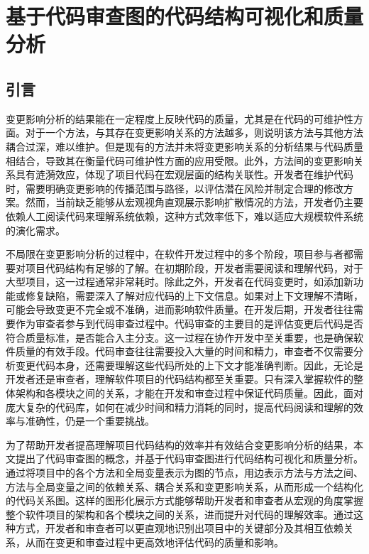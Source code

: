 \chapter{基于代码审查图的代码结构可视化和质量分析}
\section{引言}

变更影响分析的结果能在一定程度上反映代码的质量，尤其是在代码的可维护性方面。对于一个方法，与其存在变更影响关系的方法越多，则说明该方法与其他方法耦合过深，难以维护。但是现有的方法并未将变更影响关系的分析结果与代码质量相结合，导致其在衡量代码可维护性方面的应用受限。此外，方法间的变更影响关系具有涟漪效应，体现了项目代码在宏观层面的结构关联性。开发者在维护代码时，需要明确变更影响的传播范围与路径，以评估潜在风险并制定合理的修改方案。然而，当前缺乏能够从宏观视角直观展示影响扩散情况的方法，开发者仍主要依赖人工阅读代码来理解系统依赖，这种方式效率低下，难以适应大规模软件系统的演化需求。

不局限在变更影响分析的过程中，在软件开发过程中的多个阶段，项目参与者都需要对项目代码结构有足够的了解。在初期阶段，开发者需要阅读和理解代码，对于大型项目，这一过程通常非常耗时。除此之外，开发者在代码变更时，如添加新功能或修复缺陷，需要深入了解对应代码的上下文信息。如果对上下文理解不清晰，可能会导致变更不完全或不准确，进而影响软件质量。在开发后期，开发者往往需要作为审查者参与到代码审查过程中。代码审查的主要目的是评估变更后代码是否符合质量标准，是否能合入主分支。这一过程在协作开发中至关重要，也是确保软件质量的有效手段。代码审查往往需要投入大量的时间和精力\cite{花子涵2024代码审查自动化研究综述}，审查者不仅需要分析变更代码本身，还需要理解这些代码所处的上下文才能准确判断。因此，无论是开发者还是审查者，理解软件项目的代码结构都至关重要。只有深入掌握软件的整体架构和各模块之间的关系，才能在开发和审查过程中保证代码质量。因此，面对庞大复杂的代码库，如何在减少时间和精力消耗的同时，提高代码阅读和理解的效率与准确性，仍是一个重要挑战。

为了帮助开发者提高理解项目代码结构的效率并有效结合变更影响分析的结果，本文提出了代码审查图的概念，并基于代码审查图进行代码结构可视化和质量分析。通过将项目中的各个方法和全局变量表示为图的节点，用边表示方法与方法之间、方法与全局变量之间的依赖关系、耦合关系和变更影响关系，从而形成一个结构化的代码关系图。这样的图形化展示方式能够帮助开发者和审查者从宏观的角度掌握整个软件项目的架构和各个模块之间的关系，进而提升对代码的理解效率。通过这种方式，开发者和审查者可以更直观地识别出项目中的关键部分及其相互依赖关系，从而在变更和审查过程中更高效地评估代码的质量和影响。

